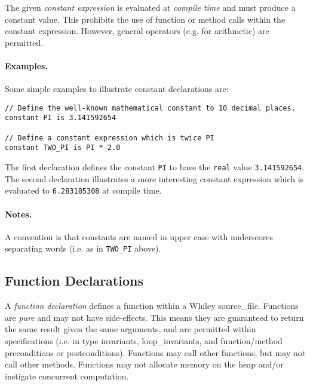 The given {\em constant expression} is evaluated at {\em compile time}
and must produce a constant value.  This prohibits the use of function
or method calls within the constant expression.  However, general
operators (e.g. for arithmetic) are permitted.

\paragraph{Examples.}  Some simple examples to illustrate constant declarations are:

\begin{lstlisting}
// Define the well-known mathematical constant to 10 decimal places.
constant PI is 3.141592654

// Define a constant expression which is twice PI
constant TWO_PI is PI * 2.0
\end{lstlisting}

The first declaration defines the constant \lstinline{PI} to have the
\lstinline{real} value \lstinline{3.141592654}.  The second
declaration illustrates a more interesting constant expression which
is evaluated to \lstinline{6.283185308} at compile time.

\paragraph{Notes.}  A convention is that constants are named in upper
case with underscores separating words (i.e. as in \lstinline{TWO_PI}
above).


\subsection{Function Declarations}
\label{c_source_files_function_decl}

A {\em function declaration} defines a function within a Whiley \gls{source_file}.  Functions are {\em pure} and may not have side-effects.  This means they are guaranteed to return the same result given the same arguments, and are permitted within specifications (i.e. in type invariants, \gls{loop_invariant}s, and function/method \gls{precondition}s or \gls{postcondition}s).  Functions may call other functions, but may not call other methods.  Functions may not allocate memory on the heap and/or instigate concurrent computation.

